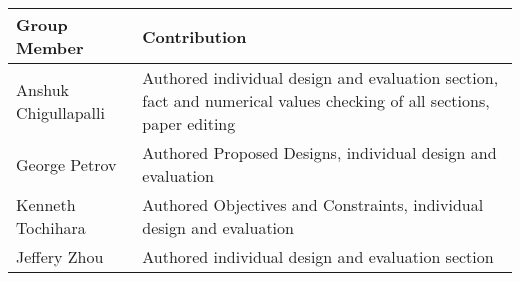     \begin{table}[H]
        \begin{center}
        \begin{tabular}{ | p{2in} | p{4in}| } 
            \hline
            \textbf{Group Member} & \textbf{Contribution} \\  \hline
            Anshuk Chigullapalli & Authored individual design and evaluation section, fact and numerical values checking of all sections, paper editing\\ \hline
            George Petrov & Authored Proposed Designs, individual design and evaluation \\ \hline
            Kenneth Tochihara & Authored Objectives and Constraints, individual design and evaluation\\ \hline
            Jeffery Zhou & Authored individual design and evaluation section\\ \hline
        \end{tabular}
        \end{center}
    \end{table}





    
